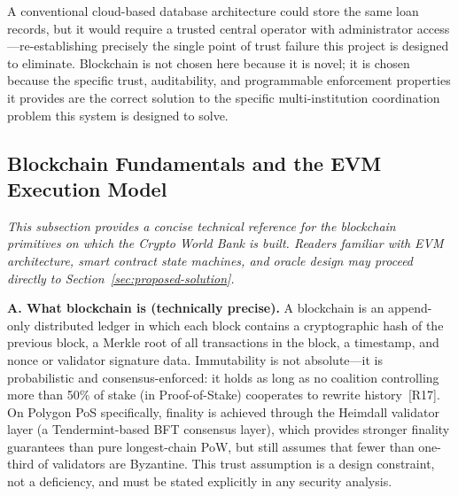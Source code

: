 \documentclass[12pt,a4paper]{report}
\begin{document}
A conventional cloud-based database architecture could store the same loan records, but it would require a trusted central operator with administrator access---re-establishing precisely the single point of trust failure this project is designed to eliminate. Blockchain is not chosen here because it is novel; it is chosen because the specific trust, auditability, and programmable enforcement properties it provides are the correct solution to the specific multi-institution coordination problem this system is designed to solve.

\subsection{Blockchain Fundamentals and the EVM Execution Model}
\label{sec:blockchain-fundamentals}

\noindent\textit{\small This subsection provides a concise technical reference for the blockchain primitives on which the Crypto World Bank is built. Readers familiar with EVM architecture, smart contract state machines, and oracle design may proceed directly to Section~\ref{sec:proposed-solution}.}

\vspace{4pt}
\textbf{A. What blockchain is (technically precise).}
A blockchain is an append-only distributed ledger in which each block contains a cryptographic hash of the previous block, a Merkle root of all transactions in the block, a timestamp, and nonce or validator signature data. Immutability is not absolute---it is probabilistic and consensus-enforced: it holds as long as no coalition controlling more than 50\% of stake (in Proof-of-Stake) cooperates to rewrite history~[R17]. On Polygon PoS specifically, finality is achieved through the Heimdall validator layer (a Tendermint-based BFT consensus layer), which provides stronger finality guarantees than pure longest-chain PoW, but still assumes that fewer than one-third of validators are Byzantine. This trust assumption is a design constraint, not a deficiency, and must be stated explicitly in any security analysis.
\end{document}
